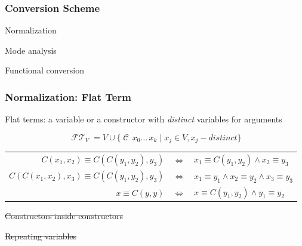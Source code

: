 \documentclass[xcolor=table, aspectratio=169]{beamer}
\newcommand{\makenote}[1]{\hfill \footnotesize{#1}}
\newcommand{\strikeoutnote}[1]{\makenote{\strikethrough{#1}}}
\newcommand{\strikethrough}[1]{\sout{#1}}
\DeclareMathOperator{\FlatTerm}{\mathcal{FT}}
\DeclareMathOperator{\Cons}{\mathcal{C}}
\begin{document}
%     
%     

\begin{frame}[fragile]
  \frametitle{Conversion Scheme}

\begin{center}
  Normalization
\end{center}

\begin{center}
  Mode analysis
\end{center}

\begin{center}
  Functional conversion
\end{center}
\end{frame}


\begin{frame}[fragile]
  \frametitle{Normalization: Flat Term}
\begin{center}
Flat terms: a variable or a constructor with \emph{distinct} variables for arguments
\end{center}

  \[  \FlatTerm_{V} = V \cup \{\Cons \, x_0 \ldots \, x_{k} \mid x_{j}\in V, x_j - distinct \} \]

\vfill

\begin{center}
\begin{tabular}{rcl}
 $C\left( x_1, x_2 \right) \equiv C\left( C\left( y_1, y_2 \right), y_3 \right)$ & $\iff$ &  $x_1 \equiv C\left( y_1, y_2 \right) \land x_2 \equiv y_3$ \\
 $C\left( C\left( x_1, x_2 \right), x_3 \right) \equiv C\left( C\left( y_1, y_2 \right), y_3 \right)$ & $\iff$ & $x_1 \equiv y_1 \land x_2 \equiv y_2 \land x_3 \equiv y_3$ \\
 $x \equiv C\left( y, y \right)$ & $\iff$ & $x \equiv C\left( y_1, y_2 \right)\land y_1 \equiv y_2$
\end{tabular}
\end{center}

\vfill

\strikeoutnote{Constructors inside constructors}

\strikeoutnote{Repeating variables}

\end{frame}
\end{document}
